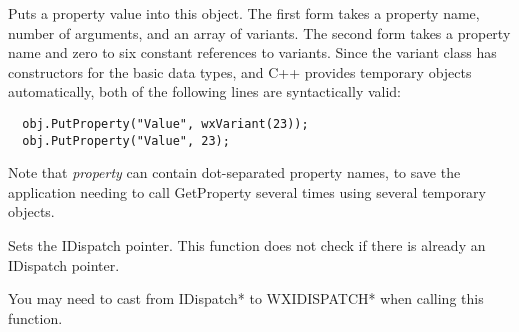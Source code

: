 Puts a property value into this object. The first form takes a property name, number of
arguments, and an array of variants. The second form takes a property name and zero to six
constant references to variants. Since the variant class has constructors for the basic
data types, and C++ provides temporary objects automatically, both of the following lines
are syntactically valid:

{\small
\begin{verbatim}
  obj.PutProperty("Value", wxVariant(23));
  obj.PutProperty("Value", 23);
\end{verbatim}
}

Note that {\it property} can contain dot-separated property names, to save the application
needing to call GetProperty several times using several temporary objects.

\label{wxautomationobjectsetdispatchptr}


Sets the IDispatch pointer. This function does not check if there is already an IDispatch pointer.

You may need to cast from IDispatch* to WXIDISPATCH* when calling this function.

